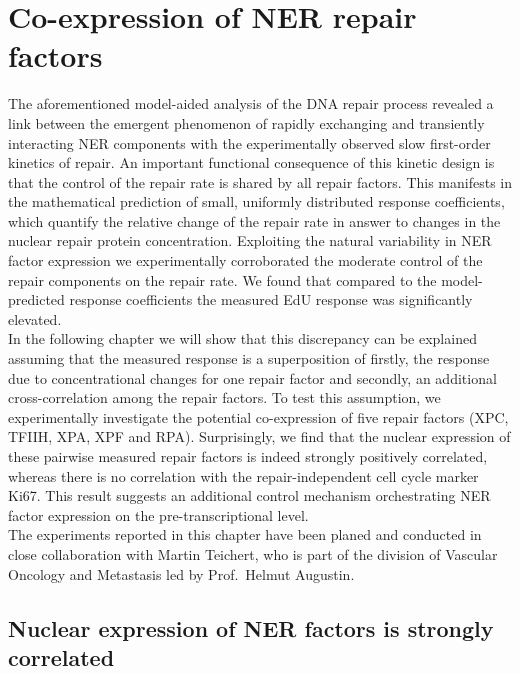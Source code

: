 \chapter{Co-expression of NER repair factors}
The aforementioned model-aided analysis of the DNA repair process revealed a link between the emergent phenomenon of rapidly exchanging and transiently interacting NER components with the experimentally observed slow first-order kinetics of repair. An important functional consequence of this kinetic design is that the control of the repair rate is shared by all repair factors. This manifests in the mathematical prediction of small, uniformly distributed response coefficients, which quantify the relative change of the repair rate in answer to changes in the nuclear repair protein concentration. Exploiting the natural variability in NER factor expression we experimentally corroborated the moderate control of the repair components on the repair rate. We found that compared to the model-predicted response coefficients the measured EdU response was significantly elevated. \\ 
In the following chapter we will show that this discrepancy can be explained assuming that the measured response is a superposition of firstly, the response due to concentrational changes for one repair factor and secondly, an additional cross-correlation among the repair factors. To test this assumption, we experimentally investigate the potential co-expression of five repair factors (XPC, TFIIH, XPA, XPF and RPA). Surprisingly, we find that the nuclear expression of these pairwise measured repair factors is indeed strongly positively correlated, whereas there is no correlation with the repair-independent cell cycle marker Ki67. This result suggests an additional control mechanism orchestrating NER factor expression on the pre-transcriptional level.\\ 

The experiments reported in this chapter have been planed and conducted in close collaboration with Martin Teichert, who is part of the division of Vascular Oncology and Metastasis led by Prof.\ Helmut Augustin. 
 

\section{Nuclear expression of NER factors is strongly correlated}

